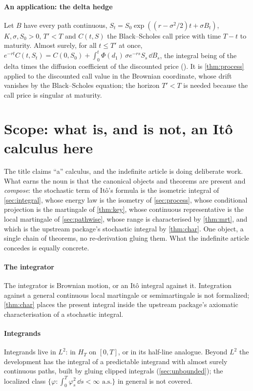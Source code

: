 \documentclass[11pt]{article}
\newcommand{\HT}{H_T}
\begin{document}
\paragraph{An application: the delta hedge}
Let $B$ have every path continuous, $S_t=S_0\exp((r-\sigma^2/2)t+\sigma B_t)$, $K,\sigma,S_0>0$, $T'<T$ and
$C(t,S)$ the Black--Scholes call price with time $T-t$ to maturity. Almost surely, for all $t\le T'$ at once,
$e^{-rt}C(t,S_t)=C(0,S_0)+\int_0^t\Phi(d_1)\,\sigma e^{-rs}S_s\,\dd B_s$, the integral being  of
the delta times the diffusion coefficient of the discounted price (). It is
\cref{thm:process} applied to the discounted call value in the Brownian coordinate, whose drift vanishes by the
Black--Scholes equation; the horizon $T'<T$ is needed because the call price is singular at maturity.

\section{Scope: what is, and is not, an It\^o calculus here}\label{sec:scope}

The title claims ``a'' calculus, and the indefinite article is doing deliberate work. What earns the noun is that the
canonical objects and theorems are present and \emph{compose}: the stochastic term of It\^o's formula is the isometric
integral of \cref{sec:integral}, whose energy law is the isometry of \cref{sec:process}, whose conditional projection is
the martingale of \cref{thm:key}, whose continuous representative is the local martingale of \cref{sec:pathwise}, whose
range is characterised by \cref{thm:mrt}, and which is the upstream package's stochastic integral by \cref{thm:char}. One
object, a single chain of theorems, no re-derivation gluing them. What the indefinite article concedes is equally
concrete.

\paragraph{The integrator}
The integrator is Brownian motion, or an It\^o integral against it. Integration against a general continuous local
martingale or semimartingale is not formalized; \cref{thm:char} places the present integral inside the upstream
package's axiomatic characterisation of a stochastic integral.

\paragraph{Integrands}
Integrands live in $L^2$: in $\HT$ on $[0,T]$, or in its half-line analogue. Beyond $L^2$ the development has the
integral of a predictable integrand with almost surely continuous paths, built by gluing clipped integrals
(\cref{sec:unbounded}); the localized class $\{\varphi:\int_0^T\varphi_s^2\,\dd s<\infty\text{ a.s.}\}$ in general is not
covered.
\end{document}
